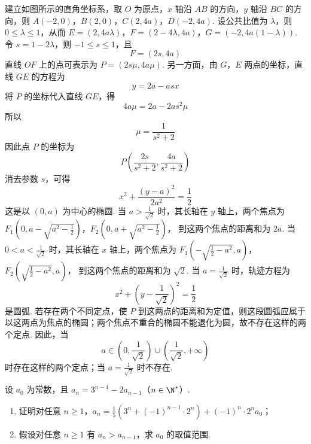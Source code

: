 \begin{solution}
建立如图所示的直角坐标系，取 \(O\) 为原点，\(x\) 轴沿 \(AB\) 的方向，\(y\) 轴沿 \(BC\) 的方向，则
\(A(-2,0)\)，\(B(2,0)\)，\(C(2,4a)\)，\(D(-2,4a)\).
设公共比值为 \(\lambda\)，则 \(0\leqslant\lambda\leqslant1\)，从而
\(E=(2,4a\lambda)\)，\(F=(2-4\lambda,4a)\)，\(G=(-2,4a(1-\lambda))\).
令 \(s=1-2\lambda\)，则 \(-1\leqslant s\leqslant1\)，且
\[
F=(2s,4a)
\]
直线 \(OF\) 上的点可表示为 \(P=(2s\mu,4a\mu)\). 另一方面，由 \(G\)，\(E\) 两点的坐标，直线 \(GE\) 的方程为
\[
y=2a-asx
\]
将 \(P\) 的坐标代入直线 \(GE\)，得
\[
4a\mu=2a-2as^{2}\mu
\]
所以
\[
\mu=\frac{1}{s^{2}+2}
\]
因此点 \(P\) 的坐标为
\[
P\left(\frac{2s}{s^{2}+2},\frac{4a}{s^{2}+2}\right)
\]
消去参数 \(s\)，可得
\[
x^{2}+\frac{(y-a)^{2}}{2a^{2}}=\frac12
\]
这是以 \((0,a)\) 为中心的椭圆. 当 \(a>\frac{1}{\sqrt2}\) 时，其长轴在 \(y\) 轴上，两个焦点为
\(F_{1}\left(0,a-\sqrt{a^{2}-\frac12}\right)\)，\(F_{2}\left(0,a+\sqrt{a^{2}-\frac12}\right)\)，
到这两个焦点的距离和为 \(2a\). 当 \(0<a<\frac{1}{\sqrt2}\) 时，其长轴在 \(x\) 轴上，两个焦点为
\(F_{1}\left(-\sqrt{\frac12-a^{2}},a\right)\)，\(F_{2}\left(\sqrt{\frac12-a^{2}},a\right)\)，
到这两个焦点的距离和为 \(\sqrt2\). 当 \(a=\frac{1}{\sqrt2}\) 时，轨迹方程为
\[
x^{2}+\left(y-\frac{1}{\sqrt2}\right)^{2}=\frac12
\]
是圆弧. 若存在两个不同定点，使 \(P\) 到这两点的距离和为定值，则这段圆弧应属于以这两点为焦点的椭圆；两个焦点不重合的椭圆不能退化为圆，故不存在这样的两个定点. 因此，当
\[
a\in\left(0,\frac{1}{\sqrt2}\right)\cup\left(\frac{1}{\sqrt2},+\infty\right)
\]
时存在这样的两个定点；当 \(a=\frac{1}{\sqrt2}\) 时不存在.
\end{solution}

\begin{problem}
设 \(a_0\) 为常数，且 \(a_n = 3^{n-1} - 2a_{n-1}\)（\(n \in \N^*\)）.

\begin{enumerate}
\item 证明对任意 \(n \geqslant 1\)，\(a_n = \frac{1}{5}\left(3^n + (-1)^{n-1} \cdot 2^n\right) + (-1)^n \cdot 2^n a_0\)；
\item 假设对任意 \(n \geqslant 1\) 有 \(a_n > a_{n-1}\)，求 \(a_0\) 的取值范围.
\end{enumerate}
\end{problem}

